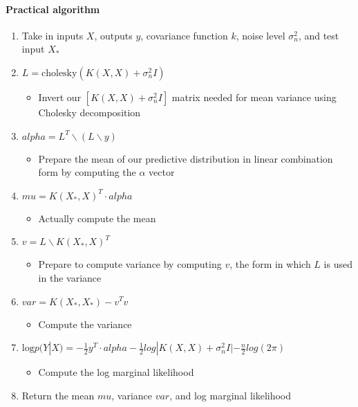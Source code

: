 \documentclass[12pt]{article}
\begin{document}
\paragraph{Practical algorithm}
\begin{enumerate}
    \item Take in inputs $X$, outputs $y$, covariance function $k$, noise level $\sigma^2_n$, and test input $X_*$
    \item $L = \text{cholesky}(K(X,X) + \sigma_n^2I)$
    \begin{itemize}
        \item Invert our $[K(X,X) + \sigma^2_nI]$ matrix needed for mean variance using Cholesky decomposition
    \end{itemize}
    \item $alpha = L^T \backslash (L \backslash y)$
    \begin{itemize}
        \item Prepare the mean of our predictive distribution in linear combination form by computing the $\alpha$ vector
    \end{itemize}
    \item $mu = K(X_*, X)^T \cdot alpha$
    \begin{itemize}
        \item Actually compute the mean
    \end{itemize}
    \item $v = L \backslash K(X_*, X)^T$
    \begin{itemize}
        \item Prepare to compute variance by computing $v$, the form in which $L$ is used in the variance
    \end{itemize}
    \item $var = K(X_*, X_*) - v^T v$
    \begin{itemize}
        \item Compute the variance
    \end{itemize}
    \item $\text{log} p(Y|X) = -\frac{1}{2}y^T \cdot alpha - \frac{1}{2}log|K(X,X) + \sigma^2_nI| - \frac{n}{2}log(2\pi)$
    \begin{itemize}
        \item Compute the log marginal likelihood 
    \end{itemize}
    \item Return the mean $mu$, variance $var$, and log marginal likelihood
\end{enumerate}
\end{document}
